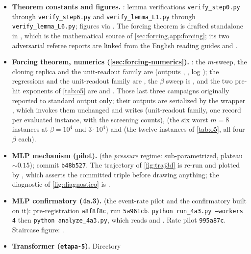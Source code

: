 \documentclass[11pt]{article}
\theoremstyle{definition}
\theoremstyle{remark}
\begin{document}
{\sloppy
\begin{itemize}
\item \textbf{Theorem constants and figures.} : lemma
verifications \texttt{verify\_step0.py} through
\texttt{verify\_step6.py} and \texttt{verify\_lemma\_L1.py}
through \texttt{verify\_lemma\_L6.py}; figures via
. The forcing theorem is drafted standalone in
, which is the mathematical
source of \cref{sec:forcing,app:forcing}; its two adversarial referee reports
are linked from the English reading guides
 and
.
\item \textbf{Forcing theorem, numerics (\cref{sec:forcing-numerics}).}
: the $m$-sweep, the cloning replica and
the unit-readout family are  (outputs
, , log );
the regressions and the unit-readout family are , the $\beta$
sweep is , and the two pre-hit exponents of \cref{tab:o5} are
 and . Those last three campaigns
originally reported to standard output only; their outputs are serialized by the
wrapper , which invokes them unchanged and writes
 (unit-readout family, one record per evaluated
instance, with the screening counts),  (the six worst
$m=8$ instances at $\beta=10^4$ and $3\cdot10^4$) and 
(the twelve instances of \cref{tab:o5}, all four $\beta$ each).
\item \textbf{MLP mechanism (pilot).}
 (the \emph{pressure} regime:
sub-parametrized, plateau $\sim0.15$); commit \texttt{b48b527}. The trajectory of
\cref{fig:traj3d} is re-run and plotted by
, which asserts the committed
triple before drawing anything; the diagnostic of \cref{fig:diagnostico} is
.
\item \textbf{MLP confirmatory (4a.3).}  (the
event-rate pilot and the confirmatory built on it): pre-registration
\texttt{a8f8f8c}, run \texttt{5a961cb}.
\texttt{python run\_4a3.py --workers 4} then \texttt{python analyze\_4a3.py},
which reads  and . Rate pilot
\texttt{995a87c}. Staircase figure: .
\item \textbf{Transformer (\texttt{etapa-5}).} Directory

\end{itemize}}
\end{document}
